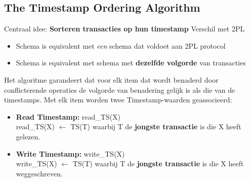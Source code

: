 \subsection{The Timestamp Ordering Algorithm}%
Centraal idee: \textbf{Sorteren transacties op hun timestamp}
Verschil met 2PL
\begin{itemize}
	\item Schema is equivalent met \textit{een} schema dat voldoet aan 2PL protocol
	\item Schema is equivalent met schema met \textbf{dezelfde volgorde} van transacties 
\end{itemize}
Het algoritme garandeert dat voor elk item dat wordt benaderd door conflicterende operaties de volgorde van benadering gelijk is als die van de timestamps.
Met elk item worden twee Timestamp-waarden geassocieerd:
\begin{itemize}
	\item \textbf{Read Timestamp:} read\_TS(X) \\
	read\_TS(X) $\leftarrow$ TS(T) waarbij T de \textbf{jongste transactie} is die X heeft gelezen.
	
	\item \textbf{Write Timestamp:} write\_TS(X) \\
	write\_TS(X) $\leftarrow$ TS(T) waarbij T de \textbf{jongste transactie} is die X heeft weggeschreven.
\end{itemize}

